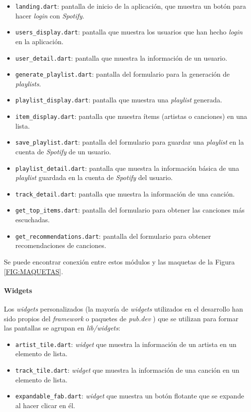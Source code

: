 \begin{itemize}
  \item \texttt{landing.dart}: pantalla de inicio de la aplicación, que muestra un botón para hacer \textit{login} con \textit{Spotify}.
  \item \texttt{users\_display.dart}: pantalla que muestra los usuarios que han hecho \textit{login} en la aplicación.
  \item \texttt{user\_detail.dart}: pantalla que muestra la información de un usuario.
  \item \texttt{generate\_playlist.dart}: pantalla del formulario para la generación de \textit{playlists}.
  \item \texttt{playlist\_display.dart}: pantalla que muestra una \textit{playlist} generada.
  \item \texttt{item\_display.dart}: pantalla que muestra ítems (artistas o canciones) en una lista.
  \item \texttt{save\_playlist.dart}: pantalla del formulario para guardar una \textit{playlist} en la cuenta de \textit{Spotify} de un usuario.
  \item \texttt{playlist\_detail.dart}: pantalla que muestra la información básica de una \textit{playlist} guardada
  en la cuenta de \textit{Spotify} del usuario.
  \item \texttt{track\_detail.dart}: pantalla que muestra la información de una canción.
  \item \texttt{get\_top\_items.dart}: pantalla del formulario para obtener las canciones más escuchadas.
  \item \texttt{get\_recommendations.dart}: pantalla del formulario para obtener recomendaciones de canciones.
\end{itemize}

Se puede encontrar conexión entre estos módulos y las maquetas de la Figura \ref{FIG:MAQUETAS}.

\paragraph{Widgets}

Los \textit{widgets} personalizados (la mayoría de \textit{widgets} utilizados en el desarrollo han sido propios del \textit{framework} o paquetes de \textit{pub.dev} \cite{pub_dev}) que 
se utilizan para formar las pantallas se agrupan en \textit{lib/widgets}:

\begin{itemize}
  \item \texttt{artist\_tile.dart}: \textit{widget} que muestra la información de un artista en un elemento de lista.
  \item \texttt{track\_tile.dart}: \textit{widget} que muestra la información de una canción en un elemento de lista.
  \item \texttt{expandable\_fab.dart}: \textit{widget} que muestra un botón flotante que se expande al hacer clicar en él.
\end{itemize}


